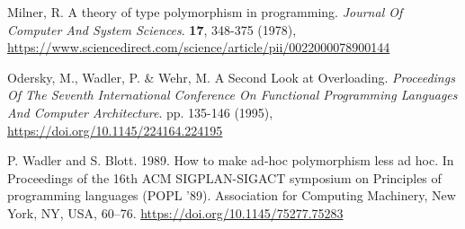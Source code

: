  Milner, R. A theory of type polymorphism in programming. 
{\em Journal Of Computer And System Sciences}. 
\textbf{17}, 348-375 (1978), \url{https://www.sciencedirect.com/science/article/pii/0022000078900144}

 Odersky, M., Wadler, P. \& Wehr, M. A Second Look at Overloading. 
{\em Proceedings Of The Seventh International Conference On Functional Programming Languages And Computer Architecture}. 
pp. 135-146 (1995), \url{https://doi.org/10.1145/224164.224195}

 P. Wadler and S. Blott. 1989. How to make ad-hoc polymorphism less ad hoc. In Proceedings of the 16th ACM SIGPLAN-SIGACT symposium on Principles of programming languages (POPL '89). Association for Computing Machinery, New York, NY, USA, 60–76. \url{https://doi.org/10.1145/75277.75283}
